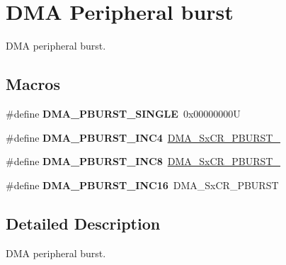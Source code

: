 \hypertarget{group___d_m_a___peripheral__burst}{}\section{D\+MA Peripheral burst}
\label{group___d_m_a___peripheral__burst}


D\+MA peripheral burst.  


\subsection*{Macros}
\begin{DoxyCompactItemize}
\item 
\mbox{\label{group___d_m_a___peripheral__burst_ga1ee9cf4dc1c8bfc5ab6dfb95a00f81ff}} 
\#define {\bfseries D\+M\+A\+\_\+\+P\+B\+U\+R\+S\+T\+\_\+\+S\+I\+N\+G\+LE}~0x00000000U
\item 
\mbox{\label{group___d_m_a___peripheral__burst_gacc54efc746528ed9e0173dad956f7caf}} 
\#define {\bfseries D\+M\+A\+\_\+\+P\+B\+U\+R\+S\+T\+\_\+\+I\+N\+C4}~\mbox{\hyperlink{group___peripheral___registers___bits___definition_gadf0eee1ad1788868a194f95107057a16}{D\+M\+A\+\_\+\+Sx\+C\+R\+\_\+\+P\+B\+U\+R\+S\+T\+\_}}
\item 
\mbox{\label{group___d_m_a___peripheral__burst_gaf76dd9b208c8606e8c5ae7abf8c26532}} 
\#define {\bfseries D\+M\+A\+\_\+\+P\+B\+U\+R\+S\+T\+\_\+\+I\+N\+C8}~\mbox{\hyperlink{group___peripheral___registers___bits___definition_ga061207b2c654a0dd62e40187c9557eda}{D\+M\+A\+\_\+\+Sx\+C\+R\+\_\+\+P\+B\+U\+R\+S\+T\+\_}}
\item 
\mbox{\label{group___d_m_a___peripheral__burst_ga705a631ea96b34aa5afa7fed06a487e0}} 
\#define {\bfseries D\+M\+A\+\_\+\+P\+B\+U\+R\+S\+T\+\_\+\+I\+N\+C16}~D\+M\+A\+\_\+\+Sx\+C\+R\+\_\+\+P\+B\+U\+R\+ST
\end{DoxyCompactItemize}


\subsection{Detailed Description}
D\+MA peripheral burst. 

